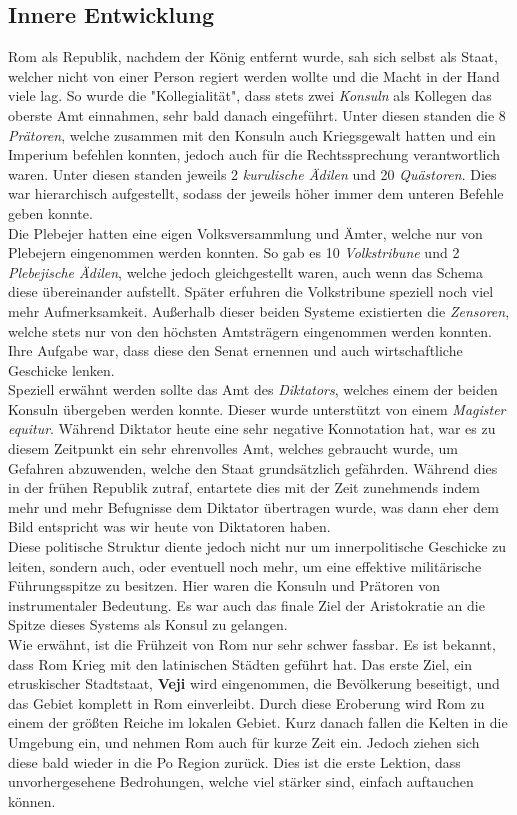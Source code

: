\documentclass{article}
\begin{document}
	\subsection{Innere Entwicklung}
	Rom als Republik, nachdem der König entfernt wurde, sah sich selbst als Staat, welcher nicht von einer Person regiert werden wollte und die Macht in der Hand viele lag. So wurde die "Kollegialität", dass stets zwei \textit{Konsuln} als Kollegen das oberste Amt einnahmen, sehr bald danach eingeführt. Unter diesen standen die 8 \textit{Prätoren}, welche zusammen mit den Konsuln auch Kriegsgewalt hatten und ein Imperium befehlen konnten, jedoch auch für die Rechtssprechung verantwortlich waren. Unter diesen standen jeweils 2 \textit{kurulische Ädilen} und 20 \textit{Quästoren}. Dies war hierarchisch aufgestellt, sodass der jeweils höher immer dem unteren Befehle geben konnte. \\
	Die Plebejer hatten eine eigen Volksversammlung und Ämter, welche nur von Plebejern eingenommen werden konnten. So gab es 10 \textit{Volkstribune} und 2 \textit{Plebejische Ädilen}, welche jedoch gleichgestellt waren, auch wenn das Schema diese übereinander aufstellt. Später erfuhren die Volkstribune speziell noch viel mehr Aufmerksamkeit. Außerhalb dieser beiden Systeme existierten die \textit{Zensoren}, welche stets nur von den höchsten Amtsträgern eingenommen werden konnten. Ihre Aufgabe war, dass diese den Senat ernennen und auch wirtschaftliche Geschicke lenken. \\
	Speziell erwähnt werden sollte das Amt des \textit{Diktators}, welches einem der beiden Konsuln übergeben werden konnte. Dieser wurde unterstützt von einem \textit{Magister equitur}. Während Diktator heute eine sehr negative Konnotation hat, war es zu diesem Zeitpunkt ein sehr ehrenvolles Amt, welches gebraucht wurde, um Gefahren abzuwenden, welche den Staat grundsätzlich gefährden. Während dies in der frühen Republik zutraf, entartete dies mit der Zeit zunehmends indem mehr und mehr Befugnisse dem Diktator übertragen wurde, was dann eher dem Bild entspricht was wir heute von Diktatoren haben. \\
	Diese politische Struktur diente jedoch nicht nur um innerpolitische Geschicke zu leiten, sondern auch, oder eventuell noch mehr, um eine effektive militärische Führungsspitze zu besitzen. Hier waren die Konsuln und Prätoren von instrumentaler Bedeutung. Es war auch das finale Ziel der Aristokratie an die Spitze dieses Systems als Konsul zu gelangen. \\
	Wie erwähnt, ist die Frühzeit von Rom nur sehr schwer fassbar. Es ist bekannt, dass Rom Krieg mit den latinischen Städten geführt hat. Das erste Ziel, ein etruskischer Stadtstaat, \textbf{Veji} wird eingenommen, die Bevölkerung beseitigt, und das Gebiet komplett in Rom einverleibt. Durch diese Eroberung wird Rom zu einem der größten Reiche im lokalen Gebiet. Kurz danach fallen die Kelten in die Umgebung ein, und nehmen Rom auch für kurze Zeit ein. Jedoch ziehen sich diese bald wieder in die Po Region zurück. Dies ist die erste Lektion, dass unvorhergesehene Bedrohungen, welche viel stärker sind, einfach auftauchen können. \\
\end{document}
